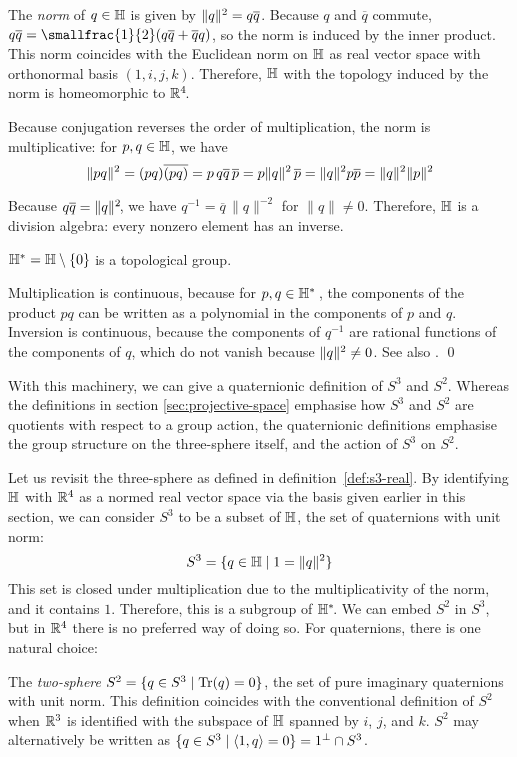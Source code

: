 The \emph{norm} of $q \in \mathbb{H}$ is given by $\|q\|^2 = q \overline{q}$.
Because $q$ and $\overline{q}$ commute,
$q\overline{q} = \smallfrac{1}{2}(q \overline{q} + \overline{q} q)$,
so the norm is induced by the inner product.
This norm coincides with the Euclidean norm on $\mathbb{H}$
as real vector space with orthonormal basis $(1, i, j, k)$.
Therefore,
$\mathbb{H}$ with the topology induced by the norm is homeomorphic to $\mathbb{R}^4\!$.

Because conjugation reverses the order of multiplication,
the norm is multiplicative:
for $p, q \in \mathbb{H}$, we have
\[ \|pq\|^2
 = (pq)\overline{(pq)}
 = p \, q \overline{q} \, \overline{p}
 = p \|q\|^2 \, \overline{p}
 = \|q\|^2 p \overline{p}
 = \|q\|^2 \|p\|^2 \]

Because $q \overline{q} = \|q\|^2\!$,
we have $q^{-1} = \overline{q} \, \|q\|^{-2}$ for $\|q\| \neq 0$.
Therefore, $\mathbb{H}$ is a division algebra:
every nonzero element has an inverse.

\proposition
$\mathbb{H}^* = \mathbb{H} \setminus \{ 0 \}$ is a topological group.

\proof
Multiplication is continuous,
because for $p, q \in \mathbb{H}^*\,$,
the components of the product $pq$
can be written as a polynomial in the components of $p$ and $q$.
Inversion is continuous,
because the components of $q^{-1}$ are rational functions of the components of $q$,
which do not vanish because $\|q\|^2 \neq 0$.
See also \parencite[ch.~\textsc{viii}, \S~1.4]{bourbaki1974}.
\qed

With this machinery,
we can give a quaternionic definition of $S^3$ and $S^2\!$.
Whereas the definitions in section \ref{sec:projective-space} emphasise
how $S^3$ and $S^2$ are quotients with respect to a group action,
the quaternionic definitions emphasise the group structure on the three-sphere itself,
and the action of $S^3$ on $S^2\!$.

Let us revisit the three-sphere as defined in definition~\ref{def:s3-real}.
By identifying $\mathbb{H}$ with $\mathbb{R}^4$ as a normed real vector space
via the basis given earlier in this section,
we can consider $S^3$ to be a subset of $\mathbb{H}$,
the set of quaternions with unit norm:
\[ S^3 = \{  q \in \mathbb{H} \mid 1 = \|q\|^2  \} \]
This set is closed under multiplication due to the multiplicativity of the norm,
and it contains $1$.
Therefore, this is a subgroup of $\mathbb{H}^*\!$.
We can embed $S^2$ in $S^3\!$,
but in $\mathbb{R}^4$ there is no preferred way of doing so.
For quaternions, there is one natural choice:

The \emph{two-sphere} $S^2 = \{  q \in S^3 \mid \operatorname{Tr}(q) = 0  \}$,
the set of pure imaginary quaternions with unit norm.
This definition coincides with the conventional definition of $S^2$
when $\mathbb{R}^3$ is identified with the subspace of $\mathbb{H}$ spanned by $i$, $j$, and $k$.
$S^2$ may alternatively be written as $\{ q \in S^3 \mid \langle 1, q \rangle = 0 \} = 1^\perp \cap S^3$.

